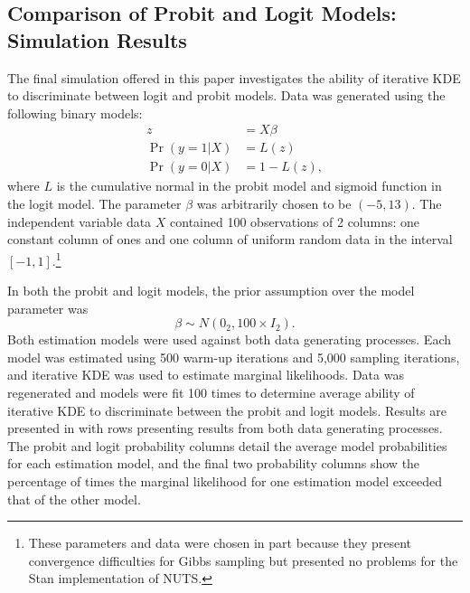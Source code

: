 \documentclass[twocolumn]{article}
\begin{document}
\subsection{Comparison of Probit and Logit Models: Simulation Results}

The final simulation offered in this paper investigates the ability of iterative KDE to discriminate between logit and probit models. Data was generated using the following binary models:
\begin{subequations}
\begin{align}
	z &= X\beta \\
	\Pr(y=1|X) &= L(z) \\
	\Pr(y=0|X) &= 1 - L(z),
\end{align}
\end{subequations}
where $L$ is the cumulative normal in the probit model and sigmoid function in the logit model. The parameter $\beta$ was arbitrarily chosen to be $(-5, 13)$. The independent variable data $X$ contained 100 observations of 2 columns: one constant column of ones and one column of uniform random data in the interval $[-1, 1]$.\footnote{These parameters and data were chosen in part because they present convergence difficulties for Gibbs sampling but presented no problems for the Stan implementation of NUTS.}



In both the probit and logit models, the prior assumption over the model parameter was
\begin{equation}
	\beta\sim N(0_2, 100\times I_2).
\end{equation}
Both estimation models were used against both data generating processes. Each model was estimated using 500 warm-up iterations and 5,000 sampling iterations, and iterative KDE was used to estimate marginal likelihoods. Data was regenerated and models were fit 100 times to determine average ability of iterative KDE to discriminate between the probit and logit models. Results are presented in  with rows presenting results from both data generating processes. The probit and logit probability columns detail the average model probabilities for each estimation model, and the final two probability columns show the percentage of times the marginal likelihood for one estimation model exceeded that of the other model.
\end{document}
